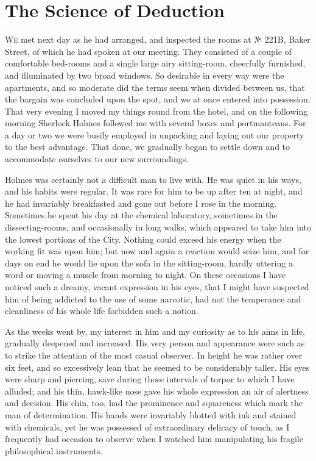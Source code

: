 \chapter{The Science of Deduction}
\lettrine{W}{e} met next day as he had arranged, and inspected the rooms at № 221B, Baker Street, of which he had spoken at our meeting. They consisted of a couple of comfortable bed-rooms and a single large airy sitting-room, cheerfully furnished, and illuminated by two broad windows. So desirable in every way were the apartments, and so moderate did the terms seem when divided between us, that the bargain was concluded upon the spot, and we at once entered into possession. That very evening I moved my things round from the hotel, and on the following morning Sherlock Holmes followed me with several boxes and portmanteaus. For a day or two we were busily employed in unpacking and laying out our property to the best advantage. That done, we gradually began to settle down and to accommodate ourselves to our new surroundings.

Holmes was certainly not a difficult man to live with. He was quiet in his ways, and his habits were regular. It was rare for him to be up after ten at night, and he had invariably breakfasted and gone out before I rose in the morning. Sometimes he spent his day at the chemical laboratory, sometimes in the dissecting-rooms, and occasionally in long walks, which appeared to take him into the lowest portions of the City. Nothing could exceed his energy when the working fit was upon him; but now and again a reaction would seize him, and for days on end he would lie upon the sofa in the sitting-room, hardly uttering a word or moving a muscle from morning to night. On these occasions I have noticed such a dreamy, vacant expression in his eyes, that I might have suspected him of being addicted to the use of some narcotic, had not the temperance and cleanliness of his whole life forbidden such a notion.

As the weeks went by, my interest in him and my curiosity as to his aims in life, gradually deepened and increased. His very person and appearance were such as to strike the attention of the most casual observer. In height he was rather over six feet, and so excessively lean that he seemed to be considerably taller. His eyes were sharp and piercing, save during those intervals of torpor to which I have alluded; and his thin, hawk-like nose gave his whole expression an air of alertness and decision. His chin, too, had the prominence and squareness which mark the man of determination. His hands were invariably blotted with ink and stained with chemicals, yet he was possessed of extraordinary delicacy of touch, as I frequently had occasion to observe when I watched him manipulating his fragile philosophical instruments.

